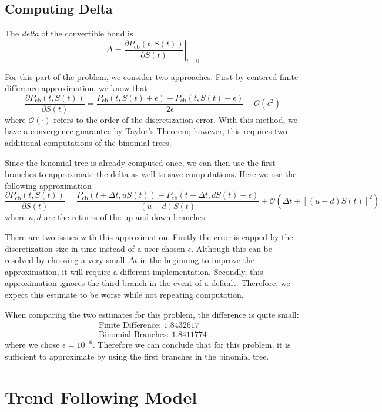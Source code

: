 \documentclass[11pt]{article}
\theoremstyle{definition}
\begin{document}
\subsection{Computing Delta}

The \emph{delta} of the convertible bond is 
%
\begin{equation*}
  \Delta = \left. \frac{\partial P_\text{cb}(t,S(t)) }{\partial S(t)}
  \right|_{t=0}
\end{equation*}

For this part of the problem, we consider two approaches. 
First by centered finite difference approximation, 
we know that
%
\begin{equation} \label{cfd}
  \frac{\partial P_\text{cb}(t,S(t)) }{\partial S(t)}
  = \frac{P_\text{cb}(t,S(t) + \epsilon) - 
          P_\text{cb}(t,S(t)-\epsilon)}{2\epsilon}
    + \mathcal{O}(\epsilon ^ 2)
\end{equation}
%
where $\mathcal{O}(\cdot)$ refers to the order of 
the discretization error.
With this method, we have a 
convergence guarantee by Taylor's Theorem;
however, this requires two additional computations 
of the binomial trees.

Since the binomial tree is already computed once,
we can then use the first branches to approximate the delta as well
to save computations. Here we use the following approximation
%
\begin{equation} \label{bino_cfd}
  \frac{\partial P_\text{cb}(t,S(t)) }{\partial S(t)}
  = \frac{P_\text{cb}(t + \Delta t, u S(t) ) - 
        P_\text{cb}(t + \Delta t, d S(t)-\epsilon)}{
        (u-d)S(t)}
    + \mathcal{O}\left(\Delta t + [(u-d)S(t)]^2\right)
\end{equation}
%
where $u,d$ are the returns of the up and down branches.

There are two issues with this approximation.
Firstly the error is capped by the discretization size in time
instead of a user chosen $\epsilon$.
Although this can be resolved by choosing a very small 
$\Delta t$ in the beginning to improve the approximation,
it will require a different implementation.
Secondly, this approximation ignores the third branch 
in the event of a default.
Therefore, we expect this estimate to be worse
while not repeating computation.

When comparing the two estimates for this problem, 
the difference is quite small:
%
\begin{equation*}
\begin{aligned}
  \text{Finite Difference: } 1.8432617 \\
  \text{Binomial Branches: } 1.8411774
\end{aligned}
\end{equation*}
%
where we chose $\epsilon = 10^{-6}$. 
Therefore we can conclude that for this problem, 
it is sufficient to approximate by 
using the first branches in the binomial tree.
















\section{Trend Following Model}
\end{document}
